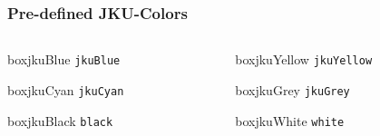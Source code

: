 \documentclass[aspectratio=169]{beamer}
\begin{document}
\begin{frame}
\frametitle{Pre-defined JKU-Colors}

\tiny
\begin{columns}[t]

\begin{column}{0.18\textwidth}
\begin{beamercolorbox}[wd=0.85\linewidth,ht=5ex,dp=3ex]{boxjkuBlue}
\centering
	\texttt{jkuBlue}\\
\end{beamercolorbox}

\vspace{2em}

\begin{beamercolorbox}[wd=0.85\linewidth,ht=5ex,dp=3ex]{boxjkuCyan}
\centering
	\texttt{jkuCyan}\\
\end{beamercolorbox}

\vspace{2em}

\begin{beamercolorbox}[wd=0.85\linewidth,ht=5ex,dp=3ex]{boxjkuBlack}
\centering
	\texttt{black}\\
\end{beamercolorbox}

\end{column}

\begin{column}{0.18\textwidth}
\begin{beamercolorbox}[wd=0.85\linewidth,ht=5ex,dp=3ex]{boxjkuYellow}
\centering
	\texttt{jkuYellow}\\
\end{beamercolorbox}

\vspace{2em}

\begin{beamercolorbox}[wd=0.85\linewidth,ht=5ex,dp=3ex]{boxjkuGrey}
\centering
	\texttt{jkuGrey}\\
\end{beamercolorbox}

\vspace{2em}

\begin{beamercolorbox}[wd=0.85\linewidth,ht=5ex,dp=3ex]{boxjkuWhite}
\centering
	\texttt{white}\\
\end{beamercolorbox}


\end{column}
\end{columns}
\end{frame}
\end{document}
